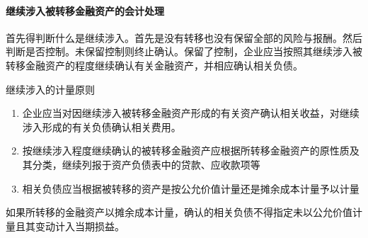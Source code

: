 \documentclass[UTF8,12pt]{ctexart}
\numberwithin{equation}{section} %
\numberwithin{figure}{section}
\numberwithin{table}{section}
\begin{document}
	\paragraph{继续涉入被转移金融资产的会计处理}
	首先得判断什么是继续涉入。首先是没有转移也没有保留全部的风险与报酬。然后判断是否控制。未保留控制则终止确认。保留了控制，企业应当按照其继续涉入被转移金融资产的程度继续确认有关金融资产，并相应确认相关负债。
	
	继续涉入的计量原则
	\begin{enumerate}
		\item 企业应当对因继续涉入被转移金融资产形成的有关资产确认相关收益，对继续涉入形成的有关负债确认相关费用。
		
		\item 按继续涉入程度继续确认的被转移金融资产应根据所转移金融资产的原性质及其分类，继续列报于资产负债表中的贷款、应收款项等
		
		\item 相关负债应当根据被转移的资产是按公允价值计量还是摊余成本计量予以计量
	\end{enumerate}

	如果所转移的金融资产以摊余成本计量，确认的相关负债不得指定未以公允价值计量且其变动计入当期损益。
	
\end{document}
